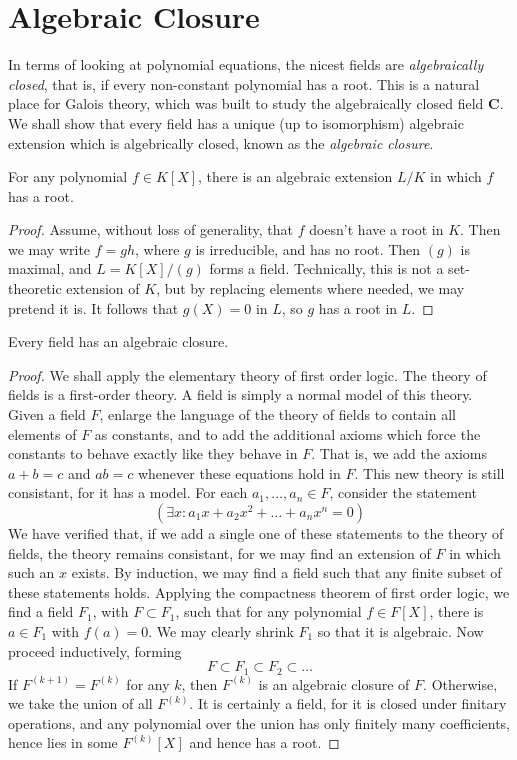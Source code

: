 \section{Algebraic Closure}

In terms of looking at polynomial equations, the nicest fields are {\it algebraically closed}, that is, if every non-constant polynomial has a root. This is a natural place for Galois theory, which was built to study the algebraically closed field $\mathbf{C}$. We shall show that every field has a unique (up to isomorphism) algebraic extension which is algebrically closed, known as the {\it algebraic closure}.

\begin{lemma}
    For any polynomial $f \in K[X]$, there is an algebraic extension $L/K$ in which $f$ has a root.
\end{lemma}
\begin{proof}
    Assume, without loss of generality, that $f$ doesn't have a root in $K$. Then we may write $f = gh$, where $g$ is irreducible, and has no root. Then $(g)$ is maximal, and $L = K[X]/(g)$ forms a field. Technically, this is not a set-theoretic extension of $K$, but by replacing elements where needed, we may pretend it is. It follows that $g(X) = 0$ in $L$, so $g$ has a root in $L$.
\end{proof}

\begin{theorem}
    Every field has an algebraic closure.
\end{theorem}
\begin{proof}
    We shall apply the elementary theory of first order logic. The theory of fields is a first-order theory. A field is simply a normal model of this theory. Given a field $F$, enlarge the language of the theory of fields to contain all elements of $F$ as constants, and to add the additional axioms which force the constants to behave exactly like they behave in $F$. That is, we add the axioms $a + b = c$ and $ab = c$ whenever these equations hold in $F$. This new theory is still consistant, for it has a model. For each $a_1, \dots, a_n \in F$, consider the statement
    \[ (\exists x: a_1 x + a_2 x^2 + \dots + a_n x^n = 0) \]
    We have verified that, if we add a single one of these statements to the theory of fields, the theory remains consistant, for we may find an extension of $F$ in which such an $x$ exists. By induction, we may find a field such that any finite subset of these statements holds. Applying the compactness theorem of first order logic, we find a field $F_1$, with $F \subset F_1$, such that for any polynomial $f \in F[X]$, there is $a \in F_1$ with $f(a) = 0$. We may clearly shrink $F_1$ so that it is algebraic. Now proceed inductively, forming
    \[ F \subset F_1 \subset F_2 \subset \dots \]
    If $F^{(k+1)} = F^{(k)}$ for any $k$, then $F^{(k)}$ is an algebraic closure of $F$. Otherwise, we take the union of all $F^{(k)}$. It is certainly a field, for it is closed under finitary operations, and any polynomial over the union has only finitely many coefficients, hence lies in some $F^{(k)}[X]$ and hence has a root.
\end{proof}

